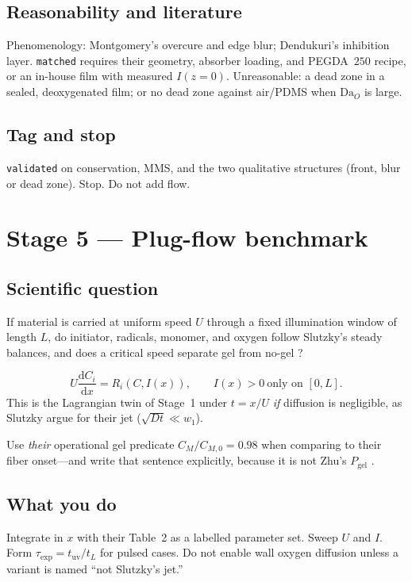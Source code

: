\documentclass[11pt,a4paper]{article}
\newcommand{\tagvalid}{\texttt{validated}}
\newcommand{\tagmatch}{\texttt{matched}}
\begin{document}
\subsection{Reasonability and literature}
Phenomenology: Montgomery's overcure and edge blur; Dendukuri's inhibition layer.
\tagmatch{} requires their geometry, absorber loading, and PEGDA~$250$ recipe, or an in-house film with measured $I(z=0)$.
Unreasonable: a dead zone in a sealed, deoxygenated film; or no dead zone against air/PDMS when $\mathrm{Da}_O$ is large.

\subsection{Tag and stop}
\tagvalid{} on conservation, MMS, and the two qualitative structures (front, blur or dead zone).
Stop. Do not add flow.

\section{Stage 5 --- Plug-flow benchmark}

\subsection{Scientific question}
If material is carried at uniform speed $U$ through a fixed illumination window of length $L$, do initiator, radicals, monomer, and oxygen follow Slutzky's steady balances, and does a critical speed separate gel from no-gel \citep{Slutzky2019}?

\begin{equation}
  U\frac{\mathrm{d}C_i}{\mathrm{d}x}=R_i(C,I(x)),\qquad I(x)>0\ \text{only on }[0,L].
\end{equation}
This is the Lagrangian twin of Stage~1 under $t=x/U$ \emph{if} diffusion is negligible, as Slutzky argue for their jet ($\sqrt{Dt}\ll w_1$).

Use \emph{their} operational gel predicate $C_M/C_{M,0}=0.98$ when comparing to their fiber onset---and write that sentence explicitly, because it is not Zhu's $P_{\mathrm{gel}}$ \citep{Zhu2020,Slutzky2019}.

\subsection{What you do}
Integrate in $x$ with their Table~2 as a labelled parameter set.
Sweep $U$ and $I$.
Form $\tau_{\mathrm{exp}}=t_{\mathrm{uv}}/t_L$ for pulsed cases.
Do not enable wall oxygen diffusion unless a variant is named ``not Slutzky's jet.''
\end{document}
